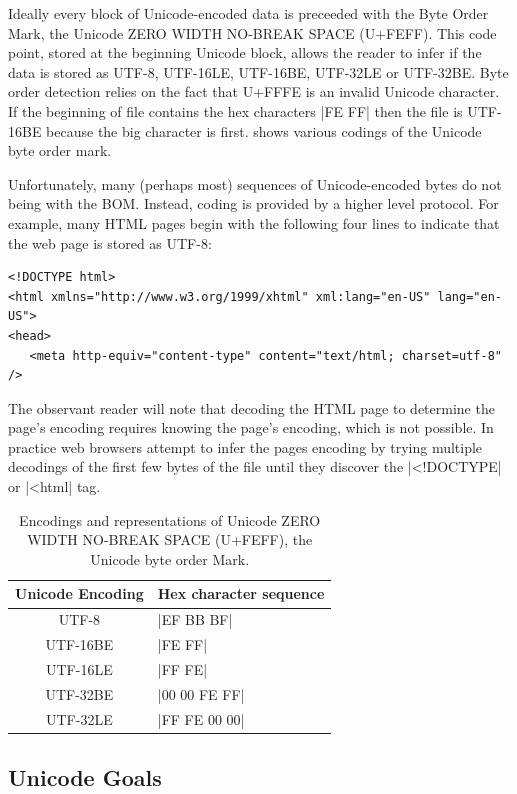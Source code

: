 Ideally every block of  Unicode-encoded data is preceeded with the Byte Order
Mark, the Unicode ZERO WIDTH NO-BREAK
SPACE (U+FEFF). This code point, stored at the beginning Unicode
block, allows the reader to infer if the data is stored as UTF-8, UTF-16LE, UTF-16BE, UTF-32LE or
UTF-32BE. Byte order detection relies on the fact that U+FFFE is an
invalid Unicode character. If the beginning of  file contains the
hex characters |FE FF| then the file is UTF-16BE because the big
character is first.  shows various codings of the
Unicode byte order mark.

Unfortunately, many (perhaps most) sequences of Unicode-encoded bytes
do not being with the BOM. Instead, coding is provided by a higher
level protocol. For example, many HTML pages begin with the following
four lines to indicate that the web page is stored as UTF-8:

\begin{Verbatim}
<!DOCTYPE html>
<html xmlns="http://www.w3.org/1999/xhtml" xml:lang="en-US" lang="en-US">
<head>
   <meta http-equiv="content-type" content="text/html; charset=utf-8" />
\end{Verbatim}

The observant reader will note that decoding the HTML page to
determine the page's encoding requires knowing the page's
encoding, which is not possible. In practice web browsers attempt to
infer the pages encoding by trying multiple decodings of the first few
bytes of the file until they discover the |<!DOCTYPE| or |<html| tag.


\begin{table}
\begin{tabular}{cl}
Unicode Encoding & Hex character sequence\\
\hline
UTF-8 & |EF BB BF|\\
UTF-16BE & |FE FF|\\
UTF-16LE & |FF FE|\\
UTF-32BE & |00 00 FE FF|\\
UTF-32LE & |FF FE 00 00|\\
\end{tabular}
\caption{Encodings and representations of Unicode ZERO WIDTH NO-BREAK
SPACE (U+FEFF), the Unicode byte order Mark.}\label{table-bom}
\end{table}


\subsection{Unicode Goals}

